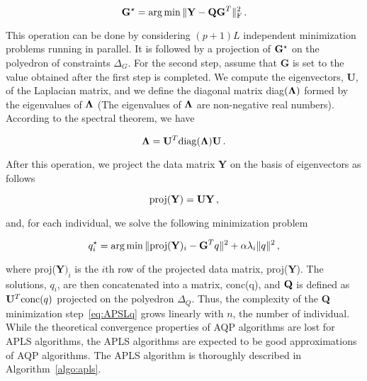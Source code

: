 \begin{equation}
{\bf G}^\star = \arg \min  \|  {\bf Y} - {\bf QG}^T \|^2_{\rm F} \, .
\end{equation}

This operation can be done by considering $(p+1)L$ independent minimization problems running in parallel. It is followed by a projection of ${\bf G}^\star$ on the polyedron of constraints $\Delta_G$. For the second step, assume that {\bf G} is set to the value obtained after the first step is completed. We compute the eigenvectors, {\bf U}, of the Laplacian matrix, and we define the diagonal matrix diag$({\bf \Lambda})$ formed by the eigenvalues of ${\bf \Lambda}$ (The eigenvalues of ${\bf \Lambda}$ are non-negative real numbers). According to the spectral theorem, we have

$$
{\bf \Lambda} = {\bf U}^T {\rm diag}({\bf \Lambda}) {\bf U} \, .
$$

\noindent  After this operation, we project the data matrix {\bf Y} on the basis of eigenvectors as follows

$$
{\rm proj} ({\bf Y}) = {\bf U}{\bf Y} \, , 
$$

\noindent and, for each individual, we solve the following minimization problem

\begin{equation}
q_i^\star = \arg \min  \|  {\rm proj} ({\bf Y})_i  - {\bf G}^Tq \|^2 + \alpha \lambda_i   \| q \|^2  \, ,
\label{eq:APSLq}
\end{equation}

\noindent where  proj({\bf Y}$)_i$ is the $i$th row of the projected data matrix, proj({\bf Y}). The solutions, $q_i$, are then concatenated into a matrix, {\rm conc}(q), and ${\bf Q}$ is defined as ${\bf U}^T {\rm conc}(q)$ projected on the polyedron $\Delta_Q$. Thus, the complexity of the {\bf Q} minimization step~\ref{eq:APSLq} grows linearly with $n$, the number of individual. While the theoretical convergence properties of AQP algorithms are lost for APLS algorithms, the APLS algorithms are expected to be good approximations of AQP algorithms. The APLS algorithm is thoroughly described in Algorithm~\ref{algo:apls}.

